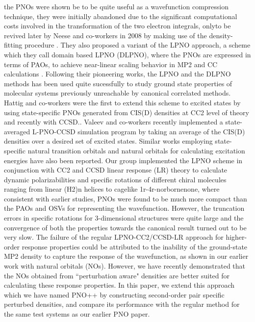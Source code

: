 the PNOs were shown be to be quite useful as a wavefunction compression technique\cite{}, they were initially 
abandoned due to the significant computational costs involved in the transformation of the two electron 
integrals, onlyto be revived later by Neese and co-workers in 2008 by making use of the density-fitting procedure
\cite{}. They also proposed a variant of the LPNO approach, a scheme which they call domain based LPNO (DLPNO), 
where the PNOs are expressed in terms of PAOs, to achieve near-linear scaling behavior in MP2 and CC calculations
\cite{}. Following their pioneering works, the LPNO and the DLPNO methods has been used quite sucessfully to study 
ground state properties of molecular systems previously unreachable by canonical correlated methods\cite{}. 
\cite{} Hattig and co-workers were the first to extend this scheme to excited states by using state-specific 
PNOs generated from CIS(D) densities at CC2 level of theory\cite{} and recently with CCSD.\cite{}. Valeev and 
co-workers recently implemented a state-averaged L-PNO-CCSD simulation program by taking an average of the 
CIS(D) densities over a desired set of excited states\cite{}. Similar works employing state-specific natural 
transition orbitals and natural orbitals for calculating excitation energies have also been reported.
\cite{} Our group implemented the LPNO scheme in conjunction with CC2 and CCSD linear response (LR) theory  
to calculate dynamic polarizabilities and specific rotations of different chiral molecules ranging from linear
(H2)n helices to cagelike 1r-4r-norbornenone, where consistent with earlier studies, PNOs were found
to be much more compact than the PAOs and OSVs for representing the wavefunction. However, the truncation errors 
in specific rotations for 3-dimensional structures were quite large and the convergence of both the properties 
towards the canonical result turned out to be very slow\cite{}. The failure of the regular LPNO-CC2/CCSD-LR approach
for higher-order response properties could be attributed to the inability of the ground-state MP2 density to 
capture the response of the wavefunction, as shown in our earlier work with natural orbitals (NOs)\cite{}. However,
we have recently demonstrated that the NOs obtained from ``perturbation aware" densities are better suited
for calculating these response properties.\cite{} In this paper, we extend this approach which we have named 
PNO++ by constructing second-order pair specific perturbed densities, and compare its performance with 
the regular method for the same test systems as our earlier PNO paper.
